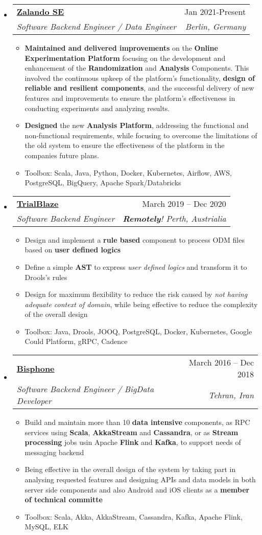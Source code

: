 \documentclass[letterpaper,12pt]{article}[leftmargin=*]
\makeatletter
\def \entryspacing {-0pt}
\newcommand{\resumeEntryStart}{\begin{itemize}[leftmargin=2.5mm]}
\newcommand{\resumeEntryEnd}{\end{itemize}\vspace{\entryspacing}}
\newcommand{\resumeItemListStart}{\begin{itemize}[leftmargin=4.5mm]}
\newcommand{\resumeItemListEnd}{\end{itemize}}
\newcommand{\resumeItem}[1]{
  \item\small{
    {#1 \vspace{-2pt}}
  }
}
\newcommand{\resumeEntryTSDL}[4]{
  \vspace{-1pt}\item[]
    \begin{tabular*}{0.97\textwidth}{l@{\extracolsep{\fill}}r}
      \textbf{\color{primary}#1} & {\firabook\color{accent}\small#2} \\
      \textit{\color{accent}\small#3} & \textit{\color{accent}\small#4} \\
    \end{tabular*}\vspace{-6pt}
}
\makeatother
\begin{document}
  \resumeEntryStart
    \resumeEntryTSDL
      {\href{https://zalando.de}{Zalando SE}}{Jan 2021-Present}
      {Software Backend Engineer / Data Engineer}{Berlin, Germany}
    \resumeItemListStart
      \resumeItem{\textbf{Maintained and delivered improvements} on the \textbf{Online Experimentation Platform} focusing on the development
      and enhancement of the \textbf{Randomization} and \textbf{Analysis} Components.
      This involved the continuous upkeep of the platform's functionality, \textbf{design of reliable and resilient
      components}, and the successful delivery of new features and improvements to ensure the platform's
      effectiveness in conducting experiments and analyzing results.}
      \resumeItem{\textbf{Designed} the new \textbf{Analysis Platform}, addressing the functional and non-functional requirements, while focusing to overcome the
      limitations of the old system to ensure the effectiveness of the platform in the companies future plans.}
      \resumeItem{Toolbox: Scala, Java, Python, Docker, Kubernetes, Airflow, AWS, PostgreSQL, BigQuery, Apache Spark/Databricks }
    \resumeItemListEnd
  \resumeEntryEnd




  \resumeEntryStart
    \resumeEntryTSDL
      {\href{https://trialblaze.com}{TrialBlaze}}{March 2019 -- Dec 2020}
      {Software Backend Engineer}{\textbf{Remotely}! Perth, Austrialia}
    \resumeItemListStart
	  \resumeItem { Design and implement a \textbf{rule based} component to process ODM files based on \textbf{user defined logics}}
      \resumeItem{Define a simple \textbf{AST} to express \textit{user defined logics} and transform it to Drools's rules}
      \resumeItem{Design for maximum flexibility to reduce the risk caused by \textit{not having adequate context of domain}, while being effective to reduce the complexity of the overall design}
      \resumeItem{Toolbox: Java, Drools, JOOQ, PostgreSQL, Docker, Kubernetes, Google Could Platform, gRPC, Cadence}
    \resumeItemListEnd
  \resumeEntryEnd


  \resumeEntryStart
    \resumeEntryTSDL
      {\href{http://bisphone.com}{Bisphone}}{March 2016 -- Dec 2018}
      {Software Backend Engineer / BigData Developer}{Tehran, Iran}
    \resumeItemListStart
      \resumeItem{Build and maintain more than 10 \textbf{data intensive} components, as RPC services using \textbf{Scala}, \textbf{AkkaStream} and \textbf{Cassandra}, or as \textbf{Stream processing} jobs usin Apache \textbf{Flink} and \textbf{Kafka}, to support needs of messaging backend}
      \resumeItem{Being effective in the overall design of the system by taking part in analysing requested features and designing APIs and data models in both server side components and also Android and iOS clients as a \textbf{member of technical committe}}
      \resumeItem{Toolbox: Scala, Akka, AkkaStream, Cassandra, Kafka, Apache Flink, MySQL, ELK}
    \resumeItemListEnd
  \resumeEntryEnd
\end{document}

